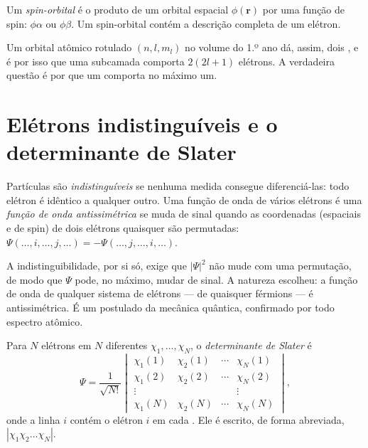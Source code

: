 \begin{definition}\label{def:b3:many-electron-atoms:spin-orbital}
Um \emph{spin-orbital} é o produto de um orbital espacial
$\phi(\mathbf r)$ por uma função de spin: $\phi\alpha$ ou $\phi\beta$. Um
spin-orbital contém a descrição completa de um elétron.
\end{definition}

Um orbital atômico rotulado $(n, l, m_l)$ no volume do 1.º ano dá, assim, dois
, e é por isso que uma subcamada comporta $2(2l+1)$ elétrons. A
verdadeira questão é por que um  comporta no máximo um.

\section{Elétrons indistinguíveis e o determinante de Slater}

\begin{definition}\label{def:b3:many-electron-atoms:indistinguishable}
Partículas são \emph{indistinguíveis} se
nenhuma medida consegue diferenciá-las: todo elétron é idêntico a qualquer
outro. Uma função de onda de vários elétrons é uma \emph{função de onda
antissimétrica} se muda de sinal quando
as coordenadas (espaciais e de spin) de dois elétrons quaisquer são permutadas:
$\Psi(\dots,i,\dots,j,\dots) = -\Psi(\dots,j,\dots,i,\dots)$.
\end{definition}

A indistinguibilidade, por si só, exige que $|\Psi|^2$ não mude com uma
permutação, de modo que $\Psi$ pode, no máximo, mudar de sinal. A natureza
escolheu: a função de onda de qualquer sistema de elétrons --- de quaisquer
férmions --- é antissimétrica. É um postulado da mecânica quântica,
confirmado por todo espectro atômico.

\begin{definition}\label{def:b3:many-electron-atoms:slater}
Para $N$ elétrons em $N$  diferentes $\chi_1, \dots, \chi_N$, o
\emph{determinante de Slater} é
\[
\Psi = \frac{1}{\sqrt{N!}}\begin{vmatrix}
\chi_1(1) & \chi_2(1) & \cdots & \chi_N(1)\\
\chi_1(2) & \chi_2(2) & \cdots & \chi_N(2)\\
\vdots & & & \vdots\\
\chi_1(N) & \chi_2(N) & \cdots & \chi_N(N)
\end{vmatrix},
\]
onde a linha $i$ contém o elétron $i$ em cada . Ele é escrito, de
forma abreviada, $|\chi_1\chi_2\dots\chi_N|$.
\end{definition}

